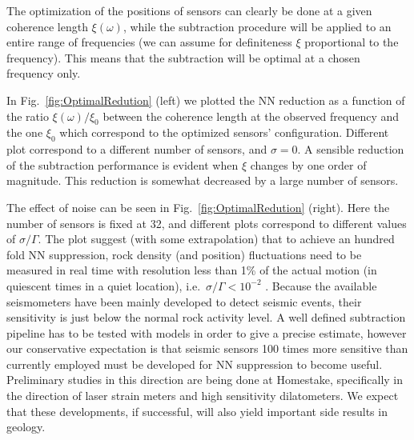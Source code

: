The optimization of the positions of sensors can clearly be done at a given coherence length $\xi(\omega)$, while the subtraction procedure will be applied to an entire range of frequencies (we can assume for definiteness $\xi$ proportional to the frequency). This means that the subtraction will be optimal at a chosen frequency only. 

In Fig.~\ref{fig:OptimalRedution} (left) we plotted the NN reduction as a function of the ratio $\xi(\omega)/\xi_{0}$ between the coherence length at the observed frequency and the one $\xi_{0}$ which correspond to the optimized sensors' configuration. Different plot correspond to a different number of sensors, and $\sigma=0$. A sensible reduction of the subtraction performance is evident when $\xi$ changes by one order of magnitude. This reduction is somewhat decreased by a large number of sensors. 

The effect of noise can be seen in Fig.~\ref{fig:OptimalRedution} (right). Here the number of sensors is fixed at 32, and different plots correspond to different values of $\sigma/\Gamma$. The plot suggest (with some extrapolation) that to achieve an hundred fold NN suppression, rock density (and position) fluctuations need to be measured in real time with resolution less than 1\% of the actual motion (in quiescent times in a quiet location), i.e.\ $\sigma/\Gamma < 10^{-2}$ . Because the available seismometers have been mainly developed to detect seismic events, their sensitivity is just below the normal rock activity level. A well defined subtraction pipeline has to be tested with models in order to give a precise estimate, however our conservative expectation is that seismic sensors 100 times more sensitive than currently employed must be developed for NN suppression to become useful. Preliminary studies in this direction are being done at Homestake, specifically in the direction of laser strain meters and high sensitivity dilatometers. We expect that these developments, if successful, will also yield important side results in geology.

\FloatBarrier
